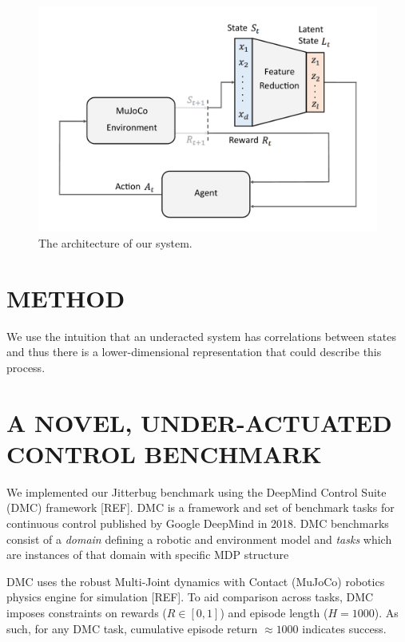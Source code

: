 \documentclass[letterpaper, 10 pt, conference]{ieeeconf}
\begin{document}

\begin{figure}[ht]
    \centering
    \includegraphics[width=\linewidth]{fig-system-arch}
    \caption{
        The architecture of our system.
    }
    \label{fig:system-arch}
\end{figure}

\section{METHOD}


We use the intuition that an underacted system has correlations between states %
and thus there is a lower-dimensional representation that could describe this process.  




\lipsum[1-9]

\section{A NOVEL, UNDER-ACTUATED CONTROL BENCHMARK}

We implemented our Jitterbug benchmark using the DeepMind Control Suite (DMC) framework [REF].
DMC is a framework and set of benchmark tasks for continuous control published by Google DeepMind in 2018.
DMC benchmarks consist of a \emph{domain} defining a robotic and environment model and \emph{tasks} which are instances of that domain with specific MDP structure

DMC uses the robust Multi-Joint dynamics with Contact (MuJoCo) robotics physics engine for simulation [REF].
To aid comparison across tasks, DMC imposes constraints on rewards ($R \in [0, 1]$) and episode length ($H = 1000$).
As such, for any DMC task, cumulative episode return $\approx 1000$ indicates success.
\end{document}
